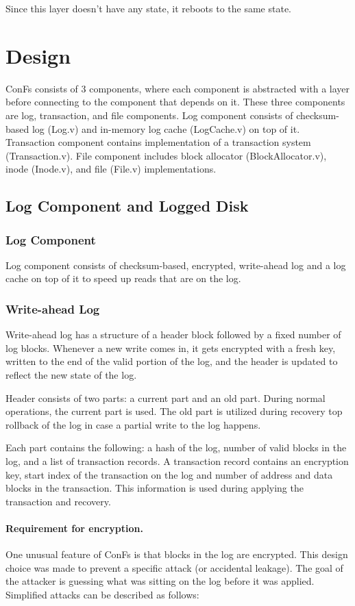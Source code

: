 Since this layer doesn't have any state, it reboots to the same state.

\section{Design}
ConFs consists of 3 components, where each component is abstracted with a layer before connecting to the component that depends on it. These three components are log, transaction, and file components. Log component consists of checksum-based log (Log.v) and in-memory log cache (LogCache.v) on top of it. Transaction component contains implementation of a transaction system (Transaction.v). File component includes block allocator (BlockAllocator.v), inode (Inode.v), and file (File.v) implementations.

\subsection{Log Component and Logged Disk}
\subsubsection{Log Component}
Log component consists of checksum-based, encrypted, write-ahead log and a log cache on top of it to speed up reads that are on the log.

\subsubsection*{Write-ahead Log}
Write-ahead log has a structure of a header block followed by a fixed number of log blocks. Whenever a new write comes in, it gets encrypted with a fresh key, written to the end of the valid portion of the log, and the header is updated to reflect the new state of the log.

Header consists of two parts: a current part and an old part. During normal operations, the current part is used. The old part is utilized during recovery top rollback of the log in case a partial write to the log happens.

Each part contains the following: a hash of the log, number of valid blocks in the log, and a list of transaction records. A transaction record contains an encryption key, start index of the transaction on the log and number of address and data blocks in the transaction. This information is used during applying the transaction and recovery.

\paragraph{Requirement for encryption.}
One unusual feature of ConFs is that blocks in the log are encrypted. This design choice was made to prevent a specific attack (or accidental leakage). The goal of the attacker is guessing what was sitting on the log before it was applied. Simplified attacks can be described as follows:

